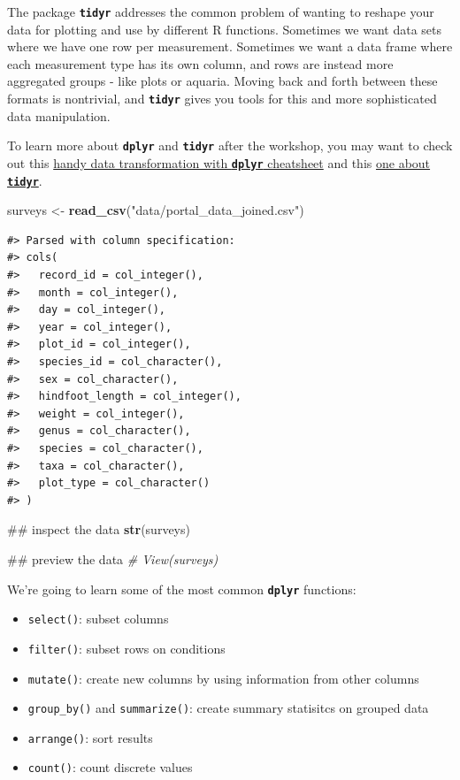 \documentclass[]{book}
\newenvironment{Shaded}{\begin{snugshade}}{\end{snugshade}}
\newcommand{\KeywordTok}[1]{\textcolor[rgb]{0.13,0.29,0.53}{\textbf{#1}}}
\newcommand{\StringTok}[1]{\textcolor[rgb]{0.31,0.60,0.02}{#1}}
\newcommand{\CommentTok}[1]{\textcolor[rgb]{0.56,0.35,0.01}{\textit{#1}}}
\newcommand{\NormalTok}[1]{#1}
\providecommand{\tightlist}{%
  \setlength{\itemsep}{0pt}\setlength{\parskip}{0pt}}
\begin{document}
The package \textbf{\texttt{tidyr}} addresses the common problem of
wanting to reshape your data for plotting and use by different R
functions. Sometimes we want data sets where we have one row per
measurement. Sometimes we want a data frame where each measurement type
has its own column, and rows are instead more aggregated groups - like
plots or aquaria. Moving back and forth between these formats is
nontrivial, and \textbf{\texttt{tidyr}} gives you tools for this and
more sophisticated data manipulation.

To learn more about \textbf{\texttt{dplyr}} and \textbf{\texttt{tidyr}}
after the workshop, you may want to check out this
\href{https://github.com/rstudio/cheatsheets/raw/master/data-transformation.pdf}{handy
data transformation with \textbf{\texttt{dplyr}} cheatsheet} and this
\href{https://github.com/rstudio/cheatsheets/raw/master/data-import.pdf}{one
about \textbf{\texttt{tidyr}}}.

\begin{Shaded}
\begin{Highlighting}[]
\NormalTok{surveys <-}\StringTok{ }\KeywordTok{read_csv}\NormalTok{(}\StringTok{"data/portal_data_joined.csv"}\NormalTok{)}
\end{Highlighting}
\end{Shaded}

\begin{verbatim}
#> Parsed with column specification:
#> cols(
#>   record_id = col_integer(),
#>   month = col_integer(),
#>   day = col_integer(),
#>   year = col_integer(),
#>   plot_id = col_integer(),
#>   species_id = col_character(),
#>   sex = col_character(),
#>   hindfoot_length = col_integer(),
#>   weight = col_integer(),
#>   genus = col_character(),
#>   species = col_character(),
#>   taxa = col_character(),
#>   plot_type = col_character()
#> )
\end{verbatim}

\begin{Shaded}
\begin{Highlighting}[]
\NormalTok{## inspect the data}
\KeywordTok{str}\NormalTok{(surveys)}

\NormalTok{## preview the data}
\CommentTok{# View(surveys)}
\end{Highlighting}
\end{Shaded}

We're going to learn some of the most common \textbf{\texttt{dplyr}}
functions:

\begin{itemize}
\tightlist
\item
  \texttt{select()}: subset columns
\item
  \texttt{filter()}: subset rows on conditions
\item
  \texttt{mutate()}: create new columns by using information from other
  columns
\item
  \texttt{group\_by()} and \texttt{summarize()}: create summary
  statisitcs on grouped data
\item
  \texttt{arrange()}: sort results
\item
  \texttt{count()}: count discrete values
\end{itemize}
\end{document}
